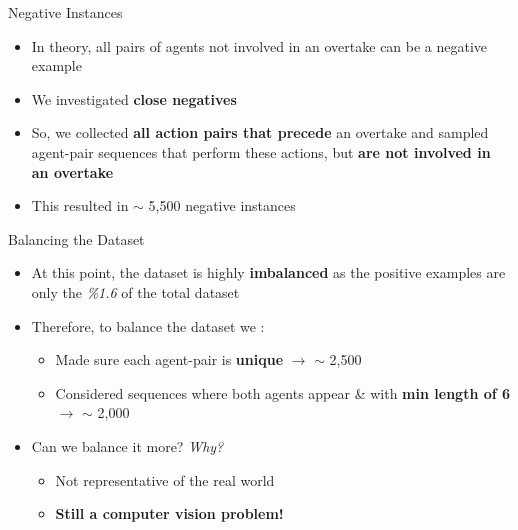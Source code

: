 \documentclass[10pt, aspectratio=169]{beamer}
\begin{document}
\begin{frame}{Negative Instances}
    \begin{itemize}
        \setlength{\itemsep}{13pt}
        \item  In theory, all pairs of agents not involved in an overtake can be a negative example
        \item We investigated \textbf{close negatives}
        \item So, we collected \textbf{all action pairs that precede} an overtake and sampled agent-pair sequences that perform these actions, but \textbf{are not involved in an overtake}
        \item This resulted in \textcolor{umBlueLighter}{$\sim$ 5,500 negative} instances
    \end{itemize}
\end{frame}


\begin{frame}{Balancing the Dataset}
    \begin{itemize}
        \setlength{\itemsep}{10pt}
        \item  At this point, the dataset is highly \textbf{imbalanced} as the positive examples are only the \textit{\%1.6} of the total dataset
        \item Therefore, to balance the dataset we :
        \vspace{5pt}
        \begin{itemize}
            \setlength{\itemsep}{3pt}
            \item Made sure each agent-pair is \textbf{unique} $\rightarrow$ \textcolor{umBlueLighter}{$\sim$ 2,500}
            \item Considered sequences where both agents appear \& with \textbf{min length of 6} $\rightarrow$ \textcolor{umBlueLighter}{$\sim$ 2,000}
        \end{itemize}
        \item Can we balance it more?  \textit{Why?}
        \vspace{5pt}
        \begin{itemize}
            \setlength{\itemsep}{3pt}
            \item Not representative of the real world
            \item \textbf{Still a computer vision problem!}
        \end{itemize}
    \end{itemize}
\end{frame}
\end{document}
